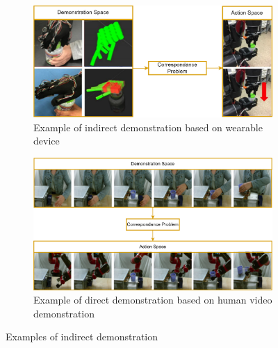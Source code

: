 \begin{figure}[tb]
     \centering
     \begin{subfigure}[b]{0.63\textwidth}
         \includegraphics[width=\textwidth]{figures/images/wearable_indirect_teaching.png}
         \caption{Example of indirect demonstration based on wearable device~\cite{liu2019_mirroring_without_overimitation}}
         \label{fig:wearable_indirect}
     \end{subfigure}
     \vfill
     \vfill
     \begin{subfigure}[b]{0.63\textwidth}
         \includegraphics[width=\textwidth]{figures/images/visual_indirect_teaching.png}
         \caption{Example of direct demonstration based on human video demonstration~\cite{smith2019avid}}
         \label{fig:visual_indirect}
     \end{subfigure}

    \caption{Examples of indirect demonstration}
    \label{fig:indirect_demonstrations}
\end{figure}

